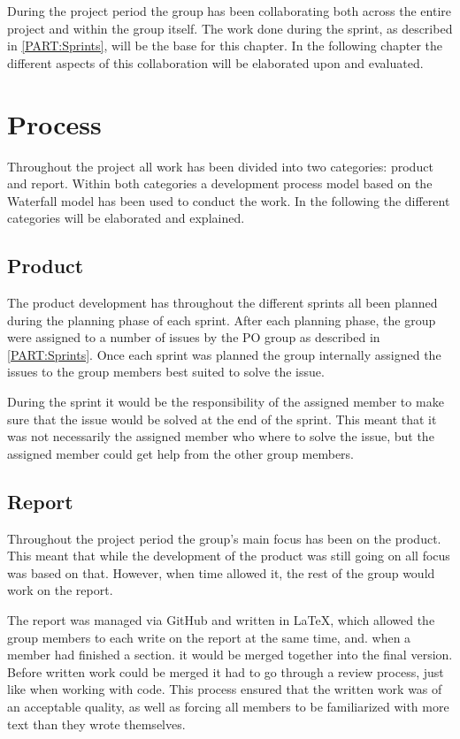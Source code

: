 During the project period the group has been collaborating both across the entire project and within the group itself. 
The work done during the sprint, as described in \autoref{PART:Sprints}, will be the base for this chapter.
In the following chapter the different aspects of this collaboration will be elaborated upon and evaluated. 

\section{Process}
Throughout the project all work has been divided into two categories: product and report. 
Within both categories a development process model based on the Waterfall model has been used to conduct the work. 
In the following the different categories will be elaborated and explained.

\subsection{Product}
The product development has throughout the different sprints all been planned during the planning phase of each sprint. 
After each planning phase, the group were assigned to a number of issues by the PO group as described in \autoref{PART:Sprints}.
Once each sprint was planned the group internally assigned the issues to the group members best suited to solve the issue.

During the sprint it would be the responsibility of the assigned member to make sure that the issue would be solved at the end of the sprint. 
This meant that it was not necessarily the assigned member who where to solve the issue, but the assigned member could get help from the other group members.

\subsection{Report}
Throughout the project period the group's main focus has been on the product. 
This meant that while the development of the product was still going on all focus was based on that.
However, when time allowed it, the rest of the group would work on the report. 

The report was managed via GitHub and written in \LaTeX, which allowed the group members to each write on the report at the same time, and. when a member had finished a section. it would be merged together into the final version. 
Before written work could be merged it had to go through a review process, just like when working with code. 
This process ensured that the written work was of an acceptable quality, as well as forcing all members to be familiarized with more text than they wrote themselves. 

